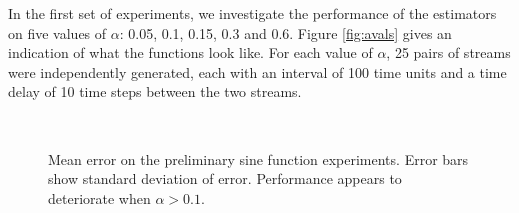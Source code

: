 \documentclass[a4paper,11pt,twoside]{article}
\begin{document}
    In the first set of experiments, we investigate the performance of the
    estimators on five values of $\alpha$: 0.05, 0.1, 0.15, 0.3 and 0.6. Figure
    \ref{fig:avals} gives an indication of what the functions look like. For
    each value of $\alpha$, 25 pairs of streams were independently generated, each
    with an interval of 100 time units and a time delay of 10 time steps between the
    two streams. 
    \begin{figure}[h!]
    \\
    \caption{Mean error on the preliminary sine function experiments. Error bars show standard
    deviation of error. Performance appears to deteriorate when $\alpha>0.1$.}
    \label{fig:prelimerror}
    \end{figure}
    
\end{document}
